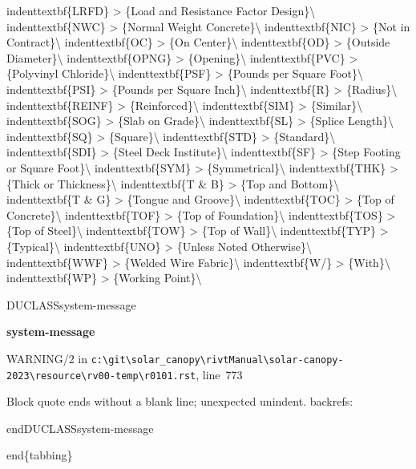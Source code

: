 \documentclass[12pt,notitle,letterpaper]{report}
\renewenvironment{quote}
{\small\list{}{\rightmargin=0cm \leftmargin=0cm}%
    \item\relax}
{\endlist}
\newenvironment{DUclass}[1]%
  {%
   \def\DocutilsClassFunctionName{DUCLASS#1}
     \csname \DocutilsClassFunctionName \endcsname}%
  {\csname end\DocutilsClassFunctionName \endcsname}%
\newenvironment{DUadmonition}%
  {\begin{center}
     \begin{lrbox}{\DUadmonitionbox}
       \begin{minipage}{0.9\linewidth}
  }%
  {    \end{minipage}
     \end{lrbox}
     \fbox{\usebox{\DUadmonitionbox}}
   \end{center}
  }
\providecommand*{\DUtitle}[1]{%
  \smallskip\noindent\textbf{#1}\smallskip}
\begin{document}
\begin{quote}
\begin{quote}
indenttextbf\{LRFD\}     >  \{Load and Resistance Factor Design\}\textbackslash{}
indenttextbf\{NWC\}      >  \{Normal Weight Concrete\}\textbackslash{}
indenttextbf\{NIC\}      >  \{Not in Contract\}\textbackslash{}
indenttextbf\{OC\}       >  \{On Center\}\textbackslash{}
indenttextbf\{OD\}       >  \{Outside Diameter\}\textbackslash{}
indenttextbf\{OPNG\}     >  \{Opening\}\textbackslash{}
indenttextbf\{PVC\}      >  \{Polyvinyl Chloride\}\textbackslash{}
indenttextbf\{PSF\}      >  \{Pounds per Square Foot\}\textbackslash{}
indenttextbf\{PSI\}      >  \{Pounds per Square Inch\}\textbackslash{}
indenttextbf\{R\}        >  \{Radius\}\textbackslash{}
indenttextbf\{REINF\}    >  \{Reinforced\}\textbackslash{}
indenttextbf\{SIM\}      >  \{Similar\}\textbackslash{}
indenttextbf\{SOG\}      >  \{Slab on Grade\}\textbackslash{}
indenttextbf\{SL\}       >  \{Splice Length\}\textbackslash{}
indenttextbf\{SQ\}       >  \{Square\}\textbackslash{}
indenttextbf\{STD\}      >  \{Standard\}\textbackslash{}
indenttextbf\{SDI\}      >  \{Steel Deck Institute\}\textbackslash{}
indenttextbf\{SF\}       >  \{Step Footing or Square Foot\}\textbackslash{}
indenttextbf\{SYM\}      >  \{Symmetrical\}\textbackslash{}
indenttextbf\{THK\}      >  \{Thick or Thickness\}\textbackslash{}
indenttextbf\{T \& B\}   >  \{Top and Bottom\}\textbackslash{}
indenttextbf\{T \& G\}   >  \{Tongue and Groove\}\textbackslash{}
indenttextbf\{TOC\}      >  \{Top of Concrete\}\textbackslash{}
indenttextbf\{TOF\}      >  \{Top of Foundation\}\textbackslash{}
indenttextbf\{TOS\}      >  \{Top of Steel\}\textbackslash{}
indenttextbf\{TOW\}      >  \{Top of Wall\}\textbackslash{}
indenttextbf\{TYP\}      >  \{Typical\}\textbackslash{}
indenttextbf\{UNO\}      >  \{Unless Noted Otherwise\}\textbackslash{}
indenttextbf\{WWF\}      >  \{Welded Wire Fabric\}\textbackslash{}
indenttextbf\{W/\}       >  \{With\}\textbackslash{}
indenttextbf\{WP\}       >  \{Working Point\}\textbackslash{}
\end{quote}

\begin{DUclass}{system-message}
\begin{DUadmonition}
\DUtitle{system-message
}

{\color{red}WARNING/2} in \texttt{c:\textbackslash{}git\textbackslash{}solar\_canopy\textbackslash{}rivtManual\textbackslash{}solar-canopy-2023\textbackslash{}resource\textbackslash{}rv00-temp\textbackslash{}r0101.rst}, line~773

Block quote ends without a blank line; unexpected unindent.
backrefs: \end{DUadmonition}
\end{DUclass}

end\{tabbing\}
\end{quote}
\end{document}
